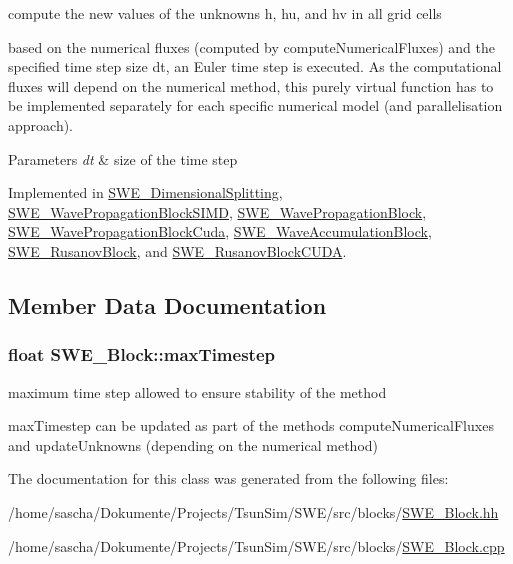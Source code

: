 compute the new values of the unknowns h, hu, and hv in all grid cells 

based on the numerical fluxes (computed by compute\-Numerical\-Fluxes) and the specified time step size dt, an Euler time step is executed. As the computational fluxes will depend on the numerical method, this purely virtual function has to be implemented separately for each specific numerical model (and parallelisation approach). 
\begin{DoxyParams}{Parameters}
{\em dt} & size of the time step \\
\hline
\end{DoxyParams}


Implemented in \hyperlink{classSWE__DimensionalSplitting_af74b527ff9ca7727442db92d2e438531}{S\-W\-E\-\_\-\-Dimensional\-Splitting}, \hyperlink{classSWE__WavePropagationBlockSIMD_a2596238868efd3cdd453d9ac2de15997}{S\-W\-E\-\_\-\-Wave\-Propagation\-Block\-S\-I\-M\-D}, \hyperlink{classSWE__WavePropagationBlock_a1b1422472a36602b34180e4ed27f6d8c}{S\-W\-E\-\_\-\-Wave\-Propagation\-Block}, \hyperlink{classSWE__WavePropagationBlockCuda_a4163045a47a73515841e754ca3859fc5}{S\-W\-E\-\_\-\-Wave\-Propagation\-Block\-Cuda}, \hyperlink{classSWE__WaveAccumulationBlock_a67b78723e81aec6e661b3710e6c41b43}{S\-W\-E\-\_\-\-Wave\-Accumulation\-Block}, \hyperlink{classSWE__RusanovBlock_a2980aa21030ba8fc607001ad817d7454}{S\-W\-E\-\_\-\-Rusanov\-Block}, and \hyperlink{classSWE__RusanovBlockCUDA_a0a18726a733492218423eed37a7ab406}{S\-W\-E\-\_\-\-Rusanov\-Block\-C\-U\-D\-A}.



\subsection{Member Data Documentation}
\hypertarget{classSWE__Block_a05cbc9b40e0483bf73dbc2bdeae7dee3}{
\subsubsection[{max\-Timestep}]{\setlength{\rightskip}{0pt plus 5cm}float S\-W\-E\-\_\-\-Block\-::max\-Timestep\hspace{0.3cm}{\ttfamily [protected]}}}\label{classSWE__Block_a05cbc9b40e0483bf73dbc2bdeae7dee3}


maximum time step allowed to ensure stability of the method 

max\-Timestep can be updated as part of the methods compute\-Numerical\-Fluxes and update\-Unknowns (depending on the numerical method) 

The documentation for this class was generated from the following files\-:\begin{DoxyCompactItemize}
\item 
/home/sascha/\-Dokumente/\-Projects/\-Tsun\-Sim/\-S\-W\-E/src/blocks/\hyperlink{SWE__Block_8hh}{S\-W\-E\-\_\-\-Block.\-hh}\item 
/home/sascha/\-Dokumente/\-Projects/\-Tsun\-Sim/\-S\-W\-E/src/blocks/\hyperlink{SWE__Block_8cpp}{S\-W\-E\-\_\-\-Block.\-cpp}\end{DoxyCompactItemize}
